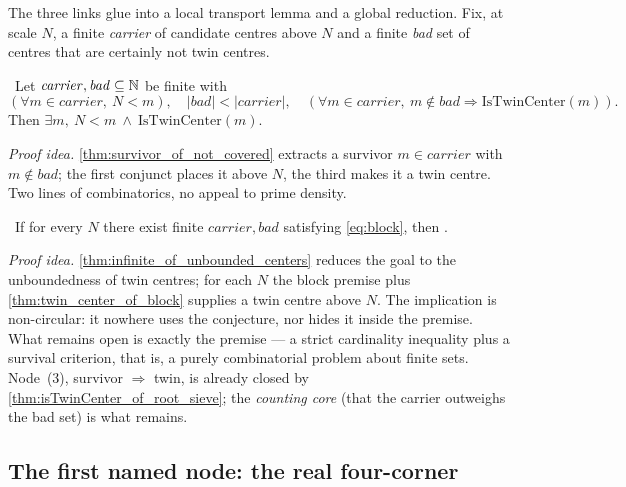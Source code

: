 The three links glue into a local transport lemma and a global reduction. Fix, at scale $N$, a
finite \emph{carrier} of candidate centres above $N$ and a finite \emph{bad} set of centres that are
certainly not twin centres.

\begin{theorem}\label{thm:twin_center_of_block}
\green{}\ Let $\mathit{carrier},\mathit{bad}\subseteq\mathbb{N}$ be finite with
\begin{equation}\label{eq:block}
  (\forall m\in\mathit{carrier},\ N<m),\quad |\mathit{bad}|<|\mathit{carrier}|,\quad
  (\forall m\in\mathit{carrier},\ m\notin\mathit{bad}\Rightarrow\mathrm{IsTwinCenter}(m)).
\end{equation}
Then $\exists m,\ N<m\ \wedge\ \mathrm{IsTwinCenter}(m)$. 
\end{theorem}

\emph{Proof idea.} \cref{thm:survivor_of_not_covered} extracts a survivor $m\in\mathit{carrier}$ with
$m\notin\mathit{bad}$; the first conjunct places it above $N$, the third makes it a twin centre. Two
lines of  combinatorics, no appeal to prime density.

\begin{theorem}\label{thm:twin_prime_conjecture_of_blocks}
\green{}\ If for every $N$ there exist finite $\mathit{carrier},\mathit{bad}$ satisfying
\cref{eq:block}, then . 
\end{theorem}

\emph{Proof idea.} \cref{thm:infinite_of_unbounded_centers} reduces the goal to the unboundedness of
twin centres; for each $N$ the block premise plus \cref{thm:twin_center_of_block} supplies a twin
centre above $N$. The implication is non-circular: it nowhere uses the conjecture, nor hides
it inside the premise. What remains open is exactly the premise --- a strict cardinality inequality
plus a survival criterion, that is, a purely combinatorial problem about finite sets. Node~(3),
survivor $\Rightarrow$ twin, is already closed by \cref{thm:isTwinCenter_of_root_sieve}; the
\emph{counting core} (that the carrier outweighs the bad set) is what remains.

\subsection{The first named node: the real four-corner}

